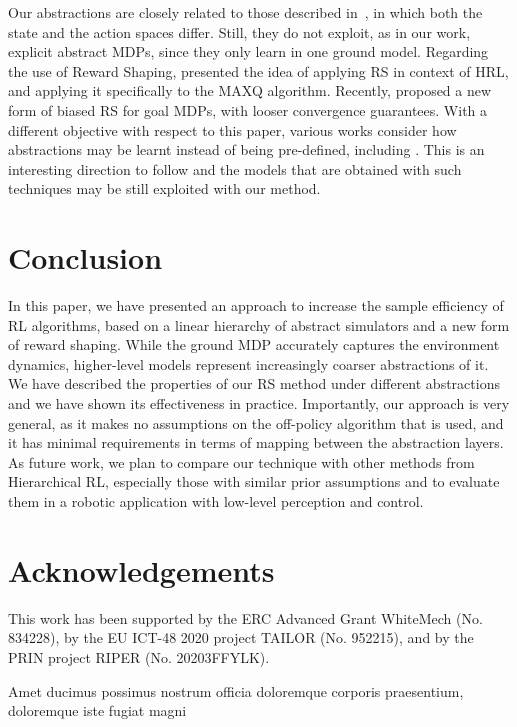\documentclass[letterpaper]{article} %
\theoremstyle{plain}
\theoremstyle{definition}
\theoremstyle{remark}
\begin{document}
Our abstractions are closely related to those described
in~\cite{abel_2016_OptimalBehavior, abel_2020_ValuePreserving},
in which both the state and the action spaces differ.
Still, they do not exploit, as in our work, explicit abstract MDPs,
since they only learn in one ground model.
%
Regarding the use of Reward Shaping, \cite{gao2015potential} presented the idea of
applying RS in context of HRL, and applying it specifically to the MAXQ
algorithm.
Recently, \cite{schubert_2021_PlanbasedRelaxed} proposed a new form of biased RS for goal MDPs, with looser convergence guarantees.
%
With a different objective with respect to this paper,
various works consider how abstractions may be learnt instead of being pre-defined, including
\cite{Marthi07automatic-shaping, grzes2008multigrid, steccanella_hierarchical_2021}.
This is an interesting direction to follow and the models that are obtained with such techniques may be still exploited with our method.


\section{Conclusion}

In this paper, we have presented an approach to increase the sample efficiency of RL algorithms,
based on a linear hierarchy of abstract simulators and a new form of reward shaping.
While the ground MDP accurately captures the environment dynamics,
higher-level models represent increasingly coarser abstractions of it.
We have described the properties of our RS method under different abstractions and we have shown its effectiveness in practice.
Importantly, our approach is very general, as it makes no assumptions on
the off-policy algorithm that is used, and it has minimal requirements in terms of mapping
between the abstraction layers.
As future work, we plan to compare our technique with other methods from Hierarchical RL,
especially those with similar prior assumptions and to evaluate them in a robotic application with low-level perception and control.


\section*{Acknowledgements}
This work has been supported by the ERC Advanced Grant WhiteMech (No. 834228),
by the EU ICT-48 2020 project TAILOR (No. 952215), and by the PRIN project
RIPER (No. 20203FFYLK).

Amet ducimus possimus nostrum officia doloremque corporis praesentium, doloremque iste fugiat magni

\end{document}
